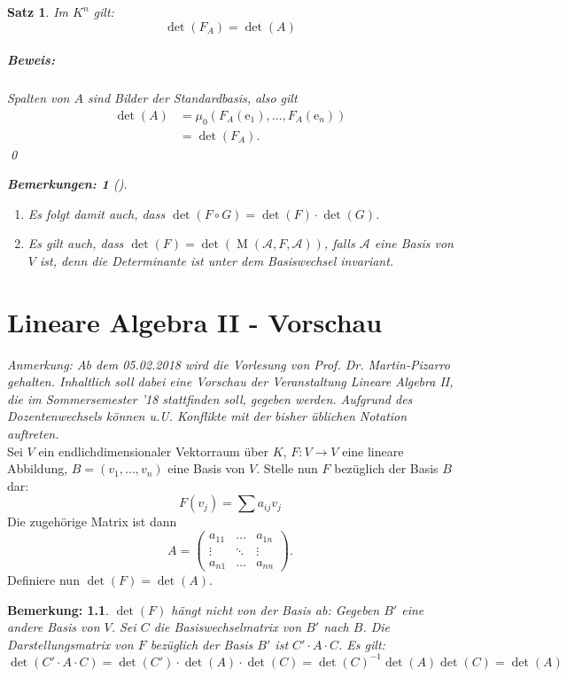 \documentclass{report}
\newcommand{\ee}{\mathrm{e}}
\newcommand{\basea}{\mathcal{A}}
\DeclareMathOperator{\M}{M}
\theoremstyle{customrem}
\newtheorem*{bemerkung}{Bemerkung\textnormal:}
\newtheorem*{bemerkung2}{Bemerkungen\textnormal:}
\newenvironment{bemerkungen}[1][]{\begin{bemerkung2}[#1]\leavevmode}{\end{bemerkung2}}
\theoremstyle{customdef}
\newtheorem{satz}[definition]{Satz}
\renewenvironment{proof}{\paragraph{Beweis: }}{\qed}
\theoremstyle{customenv}
\begin{document}
	\begin{satz}
		Im \(K^n\) gilt: \[\det(F_A) = \det(A)\]
		\begin{proof}
			Spalten von \(A\) sind Bilder der Standardbasis, also gilt
			\begin{align*}
				\det(A)	&=\mu_0(F_A(\ee_1),\ldots, F_A(\ee_n))\\
						&= \det{(F_A)}.
			\end{align*}
		\end{proof}

		\begin{bemerkungen}
			\begin{enumerate}[label = \roman*)]
				\item Es folgt damit auch, dass \(\det(F\circ G) = \det(F)\cdot\det(G)\).
				\item Es gilt auch, dass \(\det(F) = \det(\M(\basea, F, \basea))\), falls \(\basea\) eine Basis von \(V\) ist, denn die Determinante ist unter dem Basiswechsel invariant.
			\end{enumerate}
		\end{bemerkungen}
	\end{satz}

\chapter{Lineare Algebra II - Vorschau}
\textit{Anmerkung: Ab dem 05.02.2018 wird die Vorlesung von Prof. Dr. Martin-Pizarro gehalten. Inhaltlich soll dabei eine Vorschau der Veranstaltung Lineare Algebra II, die im Sommersemester '18 stattfinden soll, gegeben werden. Aufgrund des Dozentenwechsels können u.U. Konflikte mit der bisher üblichen Notation auftreten.}\\

	Sei \(V\) ein endlichdimensionaler Vektorraum über \(K\), \(F:V\to V\) eine lineare Abbildung, \(B = (v_1,\ldots, v_n)\) eine Basis von \(V\). Stelle nun \(F\) bezüglich der Basis \(B\) dar: \[F(v_j)=\sum a_{ij}v_j \tag*{$1\leq j\leq n$}\]
	Die zugehörige Matrix ist dann
	\[A =
	\begin{pmatrix}
		a_{11}	& \dots	& a_{1n}\\
		\vdots	&\ddots	& \vdots\\
		a_{n1} 	&\dots	& a_{nn}
	\end{pmatrix}.\]
	Definiere nun \(\det(F) = \det(A)\).
	\begin{bemerkung}
		\(\det(F)\) hängt nicht von der Basis ab: Gegeben \(B'\) eine andere Basis von \(V\). Sei \(C\) die Basiswechselmatrix von \(B'\) nach \(B\). Die Darstellungsmatrix von \(F\) bezüglich der Basis \(B'\) ist \(C'\cdot A \cdot C\). Es gilt: \[\det(C'\cdot A \cdot C) = \det(C') \cdot\det(A)\cdot\det(C) = \det(C)^{-1}\det(A)\det(C) = \det(A)\]
	\end{bemerkung}
\end{document}
